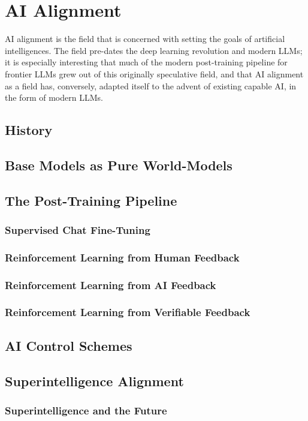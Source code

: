 \chapter{AI Alignment}\label{ch_ai_alignment}

AI alignment is the field that is concerned with setting the goals of
artificial intelligences. The field pre-dates the deep learning revolution and
modern LLMs; it is especially interesting that much of the modern post-training
pipeline for frontier LLMs grew out of this originally speculative field, and
that AI alignment as a field has, conversely, adapted itself to the advent of
existing capable AI, in the form of modern LLMs.

\section{History}
\cite{bostrom2014superintelligence}

\section{Base Models as Pure World-Models}

\section{The Post-Training Pipeline}
\subsection{Supervised Chat Fine-Tuning}
\subsection{Reinforcement Learning from Human Feedback}
\subsection{Reinforcement Learning from AI Feedback}
\subsection{Reinforcement Learning from Verifiable Feedback}

\section{AI Control Schemes}

\section{Superintelligence Alignment}

\subsection{Superintelligence and the Future}
